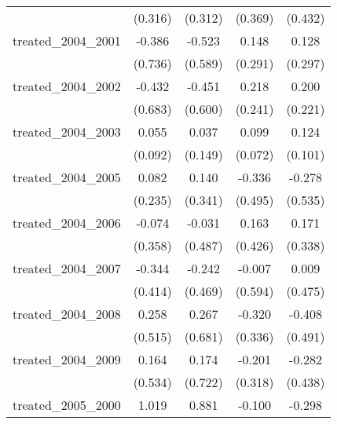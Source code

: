 {\begin{tabular}{l*{4}{c}}
            &     (0.316)         &     (0.312)         &     (0.369)         &     (0.432)         \\
[1em]
treated\_2004\_2001&      -0.386         &      -0.523         &       0.148         &       0.128         \\
            &     (0.736)         &     (0.589)         &     (0.291)         &     (0.297)         \\
[1em]
treated\_2004\_2002&      -0.432         &      -0.451         &       0.218         &       0.200         \\
            &     (0.683)         &     (0.600)         &     (0.241)         &     (0.221)         \\
[1em]
treated\_2004\_2003&       0.055         &       0.037         &       0.099         &       0.124         \\
            &     (0.092)         &     (0.149)         &     (0.072)         &     (0.101)         \\
[1em]
treated\_2004\_2005&       0.082         &       0.140         &      -0.336         &      -0.278         \\
            &     (0.235)         &     (0.341)         &     (0.495)         &     (0.535)         \\
[1em]
treated\_2004\_2006&      -0.074         &      -0.031         &       0.163         &       0.171         \\
            &     (0.358)         &     (0.487)         &     (0.426)         &     (0.338)         \\
[1em]
treated\_2004\_2007&      -0.344         &      -0.242         &      -0.007         &       0.009         \\
            &     (0.414)         &     (0.469)         &     (0.594)         &     (0.475)         \\
[1em]
treated\_2004\_2008&       0.258         &       0.267         &      -0.320         &      -0.408         \\
            &     (0.515)         &     (0.681)         &     (0.336)         &     (0.491)         \\
[1em]
treated\_2004\_2009&       0.164         &       0.174         &      -0.201         &      -0.282         \\
            &     (0.534)         &     (0.722)         &     (0.318)         &     (0.438)         \\
[1em]
treated\_2005\_2000&       1.019         &       0.881         &      -0.100         &      -0.298         \\

\end{tabular}}
